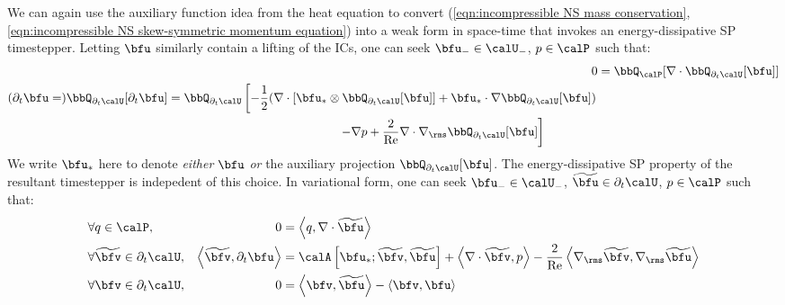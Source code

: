     \begin{remark}
    \end{remark}

    We can again use the auxiliary function idea from the heat equation to convert (\ref{eqn:incompressible NS mass conservation}, \ref{eqn:incompressible NS skew-symmetric momentum equation}) into a weak form in space-time that invokes an energy-dissipative SP timestepper. Letting $\bfu$ similarly contain a lifting of the ICs, one can seek $\bfu_{-} \in \calU_{-}$, $p \in \calP$ such that:
    \begin{align}
            0
            &=  \bbQ_{\calP}[\nabla\cdot\bbQ_{\partial_{t}\calU}[\bfu]]  \label{eqn:incompressible NS weak form 1}  \\
        \begin{split}
            (\partial_{t}\bfu
            =)  \bbQ_{\partial_{t}\calU}[\partial_{t}\bfu]
            &=  \bbQ_{\partial_{t}\calU}\left[- \frac{1}{2}(\nabla\cdot\left[\bfu_{*}\otimes\bbQ_{\partial_{t}\calU}[\bfu]\right]
            + \bfu_{*}\cdot\nabla\bbQ_{\partial_{t}\calU}[\bfu])\right.  \\
            &\qquad\qquad\qquad\qquad\qquad\qquad\qquad\left.- \nabla p
            + \frac{2}{\rmRe}\nabla\cdot\nabla_{\rms}\bbQ_{\partial_{t}\calU}[\bfu]\right]
        \end{split}  \label{eqn:incompressible NS weak form 2}
    \end{align}
    We write $\bfu_{*}$ here to denote \emph{either} $\bfu$ \emph{or} the auxiliary projection $\bbQ_{\partial_{t}\calU}[\bfu]$. The energy-dissipative SP property of the resultant timestepper is indepedent of this choice. In variational form, one can seek $\bfu_{-} \in \calU_{-}$, $\widetilde{\bfu} \in \partial_{t}\calU$, $p \in \calP$ such that:
    \begin{align}
        &\forall                 q  \in  \calP,              &                                                            0  &=  \left\langle q, \nabla\cdot\widetilde{\bfu}\right\rangle  \\
        &\forall  \widetilde{\bfv}  \in  \partial_{t}\calU,  &  \left\langle\widetilde{\bfv}, \partial_{t}\bfu\right\rangle  &=  \calA\left[\bfu_{*}; \widetilde{\bfv}, \widetilde{\bfu}\right] + \left\langle\nabla\cdot\widetilde{\bfv}, p\right\rangle - \frac{2}{\rmRe}\left\langle\nabla_{\rms}\widetilde{\bfv}, \nabla_{\rms}\widetilde{\bfu}\right\rangle  \\
        &\forall              \bfv  \in  \partial_{t}\calU,  &                                                            0  &=  \left\langle\bfv, \widetilde{\bfu}\right\rangle - \left\langle\bfv, \bfu\right\rangle
    \end{align}
